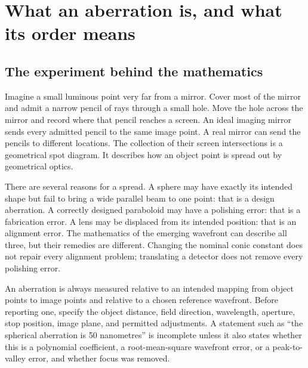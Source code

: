 
\chapter{What an aberration is, and what its order means}
\label{ab:orders}

\section{The experiment behind the mathematics}
Imagine a small luminous point very far from a mirror. Cover most of the
mirror and admit a narrow pencil of rays through a small hole. Move the hole
across the mirror and record where that pencil reaches a screen. An ideal
imaging mirror sends every admitted pencil to the same image point. A real
mirror can send the pencils to different locations. The collection of their
screen intersections is a geometrical spot diagram. It describes how an
object point is spread out by geometrical optics.

There are several reasons for a spread. A sphere may have exactly its intended
shape but fail to bring a wide parallel beam to one point: that is a design
aberration. A correctly designed paraboloid may have a polishing error: that
is a fabrication error. A lens may be displaced from its intended position:
that is an alignment error. The mathematics of the emerging wavefront can
describe all three, but their remedies are different. Changing the nominal
conic constant does not repair every alignment problem; translating a detector
does not remove every polishing error.

An aberration is always measured relative to an intended mapping from object
points to image points and relative to a chosen reference wavefront. Before
reporting one, specify the object distance, field direction, wavelength,
aperture, stop position, image plane, and permitted adjustments. A statement
such as ``the spherical aberration is 50 nanometres'' is incomplete unless it
also states whether this is a polynomial coefficient, a root-mean-square
wavefront error, or a peak-to-valley error, and whether focus was removed.

